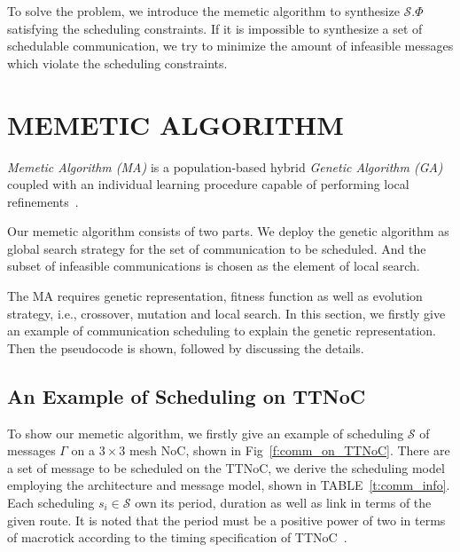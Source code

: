 \documentclass[journal]{IEEEtran}
\newcommand{\calS}{\mathcal{S}}
\theoremstyle{remark}
\begin{document}
To solve the problem, we introduce the memetic algorithm to synthesize
$\calS.\Phi$ satisfying the scheduling constraints. If it is
impossible to synthesize a set of schedulable communication, we try to
minimize the amount of infeasible messages which violate the
scheduling constraints.



\section{MEMETIC ALGORITHM\label{s:algorithm}}
\emph{Memetic Algorithm (MA)} is a population-based hybrid
\emph{Genetic Algorithm (GA)} coupled with an individual learning
procedure capable of performing local
refinements~\cite{DBLP:journals/cim/OngLC10}.

Our memetic algorithm consists of two parts. We deploy the genetic
algorithm as global search strategy for the set of communication to be
scheduled. And the subset of infeasible communications is chosen as
the element of local search.

The MA requires genetic representation, fitness function as well as
evolution strategy, i.e., crossover, mutation and local search. In
this section, we firstly give an example of communication scheduling
to explain the genetic representation. Then the pseudocode is shown,
followed by discussing the details.

\subsection{An Example of Scheduling on TTNoC}
To show our memetic algorithm,
 we firstly give an example of scheduling $\calS$ of messages $\Gamma$ on a $3\times 3$ mesh NoC,
 shown in Fig~\ref{f:comm_on_TTNoC}. 
There are a set of message to be scheduled on the TTNoC,
 we derive the scheduling model employing the architecture and message model,
 shown in TABLE~\ref{t:comm_info}.
Each scheduling $s_i\in\calS$ own its period, duration as well as link in terms of the given route.
It is noted that the period must be a positive power of two in terms of macrotick according to the timing specification of TTNoC~\cite{DBLP:conf/date/HuangBRBK12}.
\end{document}

